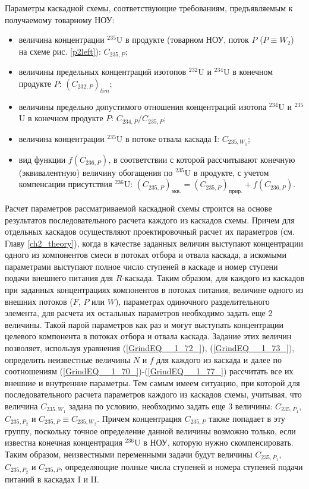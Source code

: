 Параметры каскадной схемы, соответствующие требованиям, предъявляемым к получаемому товарному НОУ:

\begin{itemize}
    \item величина концентрации $^{235}$U в продукте (товарном НОУ, поток $P$ ($P \equiv W_2$) на схеме рис. \ref{p2left}): $C_{235,{P}}$;
    \item величины предельных концентраций изотопов $^{232}$U и $^{234}$U в конечном продукте $P$: $(C_{232,{P}})_{lim}$;
    \item величины предельно допустимого отношения концентраций изотопа $^{234}$U и $^{235}$U в конечном продукте $P$: ${C_{234,{P}}}/{C_{235,{P}}}$;
    \item величина концентрации $^{235}$U в потоке отвала каскада I: $C_{235,{W_1}}$;
    \item вид функции $f(C_{236,P})$, в соответствии с которой рассчитывают конечную (эквивалентную) величину обогащения по $^{235}$U в продукте, с учетом компенсации присутствия $^{236}$U:
    $(C_{235,P})_\textit{экв.}=(C_{235,P})_\textit{прир.}+f(C_{236,P})$.    
\end{itemize}

Расчет параметров рассматриваемой каскадной схемы строится на основе результатов последовательного расчета каждого из каскадов схемы. Причем для отдельных каскадов осуществляют проектировочный расчет их параметров (см. Главу \ref{ch2_theory}), когда в качестве заданных величин выступают концентрации одного из компонентов смеси в потоках отбора и отвала каскада, а искомыми параметрами выступают полное число ступеней в каскаде и номер ступени подачи внешнего питания для $R$-каскада. Таким образом, для каждого из каскадов при заданных концентрациях компонентов в потоках питания, величине одного из внешних потоков ($F$, $P$ или $W$), параметрах одиночного разделительного элемента, для расчета их остальных параметров необходимо задать еще 2 величины. Такой парой параметров как раз и могут выступать концентрации целевого компонента в потоках отбора и отвала каскада. Задание этих величин позволяет, используя уравнения (\ref{GrindEQ__1_72_}), (\ref{GrindEQ__1_73_}), определить неизвестные величины $N$ и $f$ для каждого из каскада и далее по соотношениям (\ref{GrindEQ__1_70_})-(\ref{GrindEQ__1_77_}) рассчитать все их внешние и внутренние параметры. Тем самым имеем ситуацию, при которой для последовательного расчета параметров каждого из каскадов схемы, учитывая, что величина $C_{235,{W_1}}$ задана по условию, необходимо задать еще 3 величины: $C_{235,{P_1}}$, $C_{235,{P_2}}$ и $C_{235,{P}}\equiv C_{235,{W_2}}$. Причем концентрация $C_{235,{P}}$ также попадает в эту группу, поскольку точное определение данной величины возможно только, если известна конечная концентрация $^{236}$U в НОУ, которую нужно скомпенсировать. Таким образом, неизвестными переменными задачи будут величины $C_{235,{P_1}}$, $C_{235,{P_2}}$ и $C_{235,{P}}$, определяющие полные числа ступеней и номера ступеней подачи питаний в каскадах I и II.

